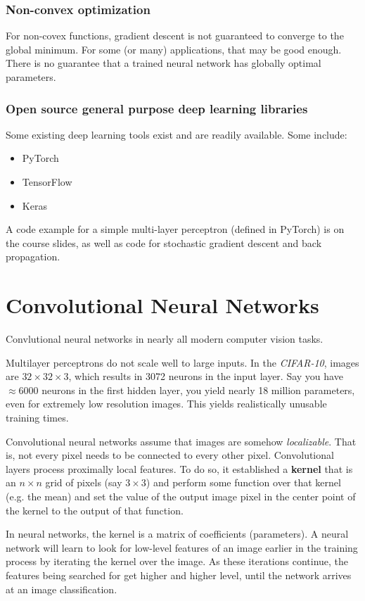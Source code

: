 \documentclass[titlepage, 12pt, leqno]{article}
\begin{document}
\subsubsection{Non-convex optimization}
For non-covex functions, gradient descent is not guaranteed to converge to the
global minimum. For some (or many) applications, that may be good enough. There
is no guarantee that a trained neural network has globally optimal parameters.

\subsubsection{Open source general purpose deep learning libraries}
Some existing deep learning tools exist and are readily available. Some include:
\begin{itemize}
    \item PyTorch
    \item TensorFlow
    \item Keras
\end{itemize}
A code example for a simple multi-layer perceptron (defined in PyTorch) is on 
the course slides, as well as code for stochastic gradient descent and back
propagation.

\pagebreak
\section{Convolutional Neural Networks}

Convlutional neural networks in nearly all modern computer vision tasks.

Multilayer perceptrons do not scale well to large inputs. In the 
\textit{CIFAR-10}, images are $32 \times 32 \times 3$, which results in 
3072 neurons in the input layer. Say you have $\approx 6000$ neurons in the 
first hidden layer, you yield nearly 18 million parameters, even for extremely
low resolution images. This yields realistically unusable training times.

Convolutional neural networks assume that images are somehow 
\textit{localizable}. That is, not every pixel needs to be connected to every
other pixel. Convolutional layers process proximally local features. To do so,
it established a \textbf{kernel} that is an $n\times n$ grid of pixels (say
$3\times 3$) and perform some function over that kernel (e.g. the mean) and
set the value of the output image pixel in the center point of the kernel to the
output of that function.

In neural networks, the kernel is a matrix of coefficients (parameters). A
neural network will learn to look for low-level features of an image earlier in
the training process by iterating the kernel over the image. As these iterations
continue, the features being searched for get higher and higher level, until
the network arrives at an image classification.
\end{document}
